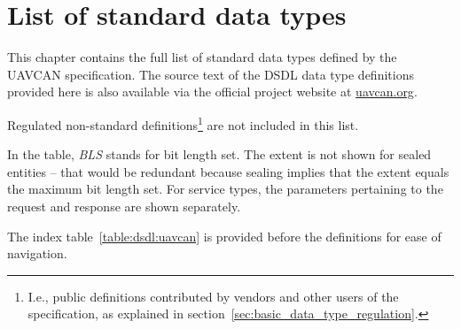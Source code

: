 \chapter{List of standard data types}\label{sec:sdt}

This chapter contains the full list of standard data types defined by the UAVCAN specification.
The source text of the DSDL data type definitions provided here is also available via the
official project website at \href{http://uavcan.org}{uavcan.org}.

Regulated non-standard definitions\footnote{%
    I.e., public definitions contributed by vendors and other users
    of the specification, as explained in section~\ref{sec:basic_data_type_regulation}.
} are not included in this list.

In the table, \emph{BLS} stands for bit length set.
The extent is not shown for sealed entities -- that would be redundant because sealing implies
that the extent equals the maximum bit length set.
For service types, the parameters pertaining to the request and response are shown separately.

The index table~\ref{table:dsdl:uavcan} is provided before the definitions for ease of navigation.

\clearpage{}
